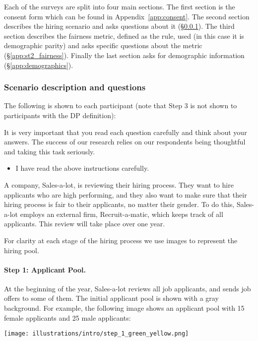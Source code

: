 \documentclass{article}
\newcommand{\checkbox}{\text{\fboxsep=-.15pt\fbox{\rule{0pt}{1.5ex}\rule{1.5ex}{0pt}}}}
\begin{document}
Each of the surveys are split into four main sections. The first section is the consent form which can be found in Appendix~\ref{app:consent}. The second section describes the hiring scenario and asks questions about it (\S\ref{app:st2_scenarios}). The third section describes the fairness metric, defined as the rule, used (in this case it is demographic parity) and asks specific questions about the metric (\S\ref{app:st2_fairness}). Finally the last section asks for demographic information (\S\ref{app:demographics}).

\subsubsection{Scenario description and questions}\label{app:st2_scenarios}
The following is shown to each participant (note that Step 3 is not shown to participants with the DP definition):

It is very important that you read each question carefully and think about your answers. The success of our research relies on our respondents being thoughtful and taking this task seriously.
\begin{itemize}
    \vspace{-8pt}
    \item[\checkbox] I have read the above instructions carefully.
    \vspace{-8pt}
\end{itemize}

A company, Sales-a-lot, is reviewing their hiring process. They want to hire applicants who are high performing, and they also want to make sure that their hiring process is fair to their applicants, no matter their gender. To do this, Sales-a-lot employs an external firm, Recruit-a-matic, which keeps track of all applicants. This review will take place over one year.
 
For clarity at each stage of the hiring process we use images to represent the hiring pool.

\paragraph{Step 1: Applicant Pool.} At the beginning of the year, Sales-a-lot reviews all job applicants, and sends job offers to some of them. The initial applicant pool is shown with a gray background. For example, the following image shows an applicant pool with 15 female applicants and 25 male applicants:

\texttt{[image: illustrations/intro/step\_1\_green\_yellow.png]}
\end{document}
